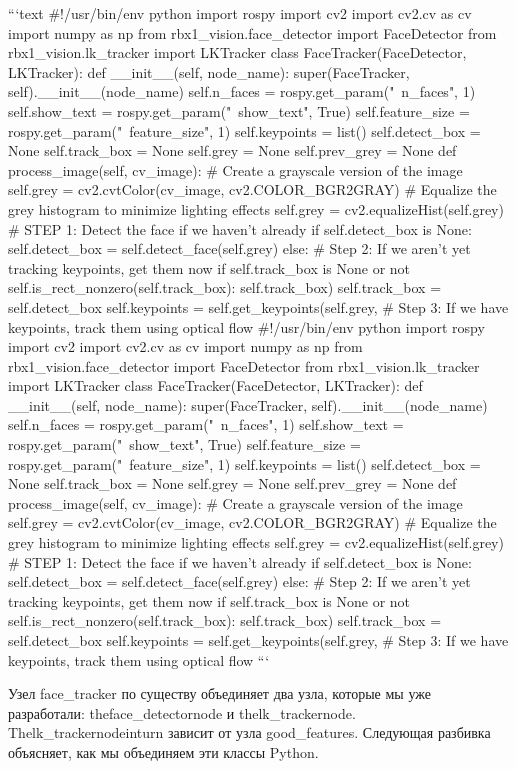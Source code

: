 ```text
#!/usr/bin/env python 
import rospy
import cv2
import cv2.cv as cv
import numpy as np
from rbx1_vision.face_detector import FaceDetector
from rbx1_vision.lk_tracker import LKTracker
class FaceTracker(FaceDetector, LKTracker):
def __init__(self, node_name):
super(FaceTracker, self).__init__(node_name)
self.n_faces = rospy.get_param("~n_faces", 1)
self.show_text = rospy.get_param("~show_text", True)
self.feature_size = rospy.get_param("~feature_size", 1)
self.keypoints = list()
self.detect_box = None
self.track_box = None
self.grey = None
self.prev_grey = None
def process_image(self, cv_image):
# Create a grayscale version of the image
self.grey = cv2.cvtColor(cv_image, cv2.COLOR_BGR2GRAY)
# Equalize the grey histogram to minimize lighting effects
self.grey = cv2.equalizeHist(self.grey)
# STEP 1: Detect the face if we haven't already
if self.detect_box is None:
self.detect_box = self.detect_face(self.grey)
else:
# Step 2: If we aren't yet tracking keypoints, get them now
if self.track_box is None or not
self.is_rect_nonzero(self.track_box):
self.track_box) 
self.track_box = self.detect_box self.keypoints = self.get_keypoints(self.grey,
# Step 3: If we have keypoints, track them using optical flow
#!/usr/bin/env python 
import rospy
import cv2
import cv2.cv as cv
import numpy as np
from rbx1_vision.face_detector import FaceDetector
from rbx1_vision.lk_tracker import LKTracker
class FaceTracker(FaceDetector, LKTracker):
def __init__(self, node_name):
super(FaceTracker, self).__init__(node_name)
self.n_faces = rospy.get_param("~n_faces", 1)
self.show_text = rospy.get_param("~show_text", True)
self.feature_size = rospy.get_param("~feature_size", 1)
self.keypoints = list()
self.detect_box = None
self.track_box = None
self.grey = None
self.prev_grey = None
def process_image(self, cv_image):
# Create a grayscale version of the image
self.grey = cv2.cvtColor(cv_image, cv2.COLOR_BGR2GRAY)
# Equalize the grey histogram to minimize lighting effects
self.grey = cv2.equalizeHist(self.grey)
# STEP 1: Detect the face if we haven't already
if self.detect_box is None:
self.detect_box = self.detect_face(self.grey)
else:
# Step 2: If we aren't yet tracking keypoints, get them now
if self.track_box is None or not
self.is_rect_nonzero(self.track_box):
self.track_box) 
self.track_box = self.detect_box self.keypoints = self.get_keypoints(self.grey,
# Step 3: If we have keypoints, track them using optical flow
```

Узел face\_tracker по существу объединяет два узла, которые мы уже разработали: theface\_detectornode и thelk\_trackernode. Thelk\_trackernodeinturn зависит от узла good\_features. Следующая разбивка объясняет, как мы объединяем эти классы Python.

